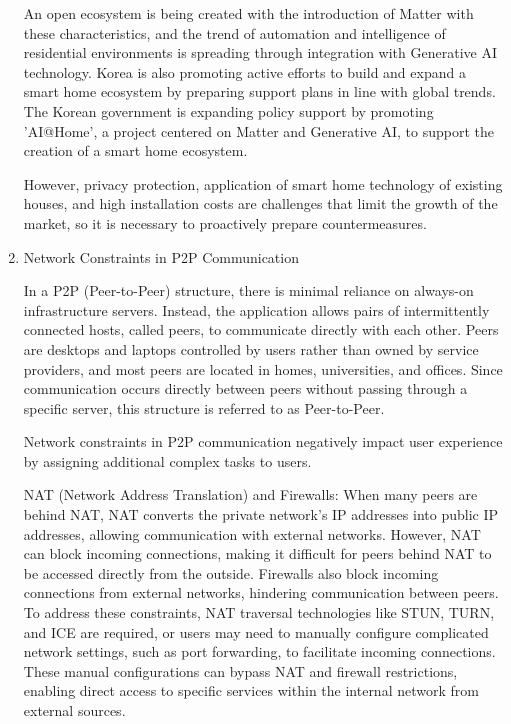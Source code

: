 \documentclass[conference]{IEEEtran}
\begin{document}
\begin{enumerate}[itemsep=2ex, parsep=1ex]
    An open ecosystem is being created with the introduction of Matter with these characteristics, and the trend of automation and intelligence of residential environments is spreading through integration with Generative AI technology. Korea is also promoting active efforts to build and expand a smart home ecosystem by preparing support plans in line with global trends. The Korean government is expanding policy support by promoting 'AI@Home', a project centered on Matter and Generative AI, to support the creation of a smart home ecosystem.
    
    However, privacy protection, application of smart home technology of existing houses, and high installation costs are challenges that limit the growth of the market, so it is necessary to proactively prepare countermeasures.
    
    \item Network Constraints in P2P Communication
    
    In a P2P (Peer-to-Peer) structure, there is minimal reliance on always-on infrastructure servers. Instead, the application allows pairs of intermittently connected hosts, called peers, to communicate directly with each other. Peers are desktops and laptops controlled by users rather than owned by service providers, and most peers are located in homes, universities, and offices. Since communication occurs directly between peers without passing through a specific server, this structure is referred to as Peer-to-Peer. 

    Network constraints in P2P communication negatively impact user experience by assigning additional complex tasks to users.
    
    NAT (Network Address Translation) and Firewalls: 
    When many peers are behind NAT, NAT converts the private network's IP addresses into public IP addresses, allowing communication with external networks. However, NAT can block incoming connections, making it difficult for peers behind NAT to be accessed directly from the outside.
    Firewalls also block incoming connections from external networks, hindering communication between peers.
    To address these constraints, NAT traversal technologies like STUN, TURN, and ICE are required, or users may need to manually configure complicated network settings, such as port forwarding, to facilitate incoming connections. These manual configurations can bypass NAT and firewall restrictions, enabling direct access to specific services within the internal network from external sources.
    

\end{enumerate}
\end{document}
